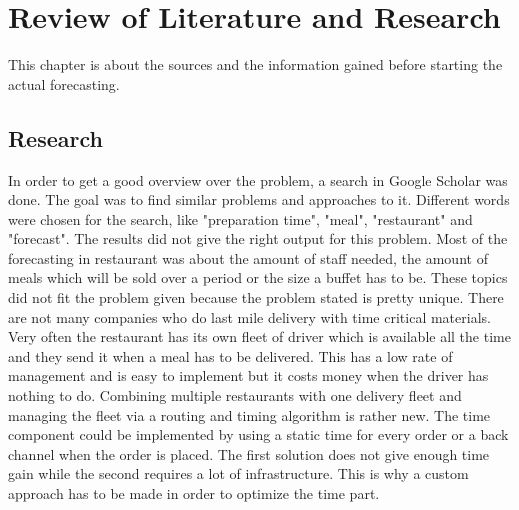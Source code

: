 \renewcommand{\thepage}{\arabic{page}}
\chapter{Review of Literature and Research}\label{chapter:Review of Literature and Research}
This chapter is about the sources and the information gained before starting the actual forecasting.
\section{Research}\label{section:Research}
In order to get a good overview over the problem, a search in Google Scholar was done. The goal was to find similar problems and approaches to it. Different words were chosen for the search, like "preparation time", "meal", "restaurant" and "forecast". The results did not give the right output for this problem. Most of the forecasting in restaurant was about the amount of staff needed, the amount of meals which will be sold over a period or the size a buffet has to
be. These topics did not fit the problem given because the problem stated is pretty unique. There are not many companies who do last mile delivery with time critical materials. Very often the restaurant has its own fleet of driver which is available all the time and they send it when a meal has to be delivered. This has a low rate of management and is easy to implement but it costs money when the driver has nothing to do. Combining multiple restaurants with one delivery fleet and managing the fleet via a routing and timing algorithm is rather new. The time component could be implemented by using a static time for every order or a back channel when the order is placed. The first solution does not give enough time gain while the second requires a lot of infrastructure. This is why a custom approach has to be made in order to optimize the time part.
